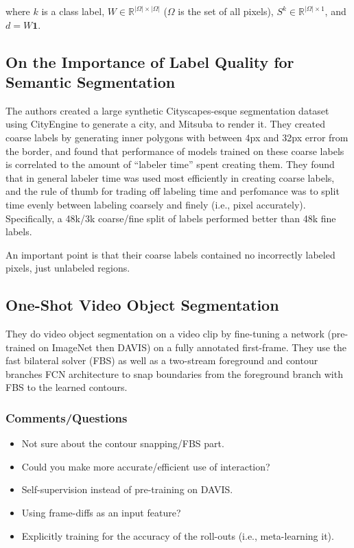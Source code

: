 \documentclass[a4paper, 12pt]{article}
\begin{document}
where $k$ is a class label, $W \in \mathbb{R}^{|\Omega| \times |\Omega|}$
($\Omega$ is the set of all pixels), $S^k \in \mathbb{R}^{|\Omega| \times 1}$,
and~$d = W\mathbf{1}$.


\subsection{On the Importance of Label Quality for Semantic
            Segmentation~\cite{Zlateski_2018_CVPR}}

The authors created a large synthetic Cityscapes-esque segmentation dataset
using CityEngine to generate a city, and Mitsuba to render it. They created
coarse labels by generating inner polygons with between 4px and 32px error from
the border, and found that performance of models trained on these coarse labels
is correlated to the amount of ``labeler time'' spent creating them. They found
that in general labeler time was used most efficiently in creating coarse
labels, and the rule of thumb for trading off labeling time and perfomance was
to split time evenly between labeling coarsely and finely (i.e., pixel
accurately). Specifically, a 48k/3k coarse/fine split of labels performed
better than 48k fine labels.

An important point is that their coarse labels contained no incorrectly labeled
pixels, just unlabeled regions.


\subsection{One-Shot Video Object Segmentation~\cite{caelles2017oneshot}}

They do video object segmentation on a video clip by fine-tuning a network
(pre-trained on ImageNet then DAVIS) on a fully annotated first-frame.
They use the fast bilateral solver (FBS) as well as a two-stream foreground and
contour branches FCN architecture to snap boundaries from the foreground branch
with FBS to the learned contours.

\subsubsection{Comments/Questions}

\begin{itemize}
        \item Not sure about the contour snapping/FBS part.

        \item Could you make more accurate/efficient use of interaction?

        \item Self-supervision instead of pre-training on DAVIS\@.

        \item Using frame-diffs as an input feature?

        \item Explicitly training for the accuracy of the roll-outs (i.e.,
                meta-learning it).
\end{itemize}
\end{document}
